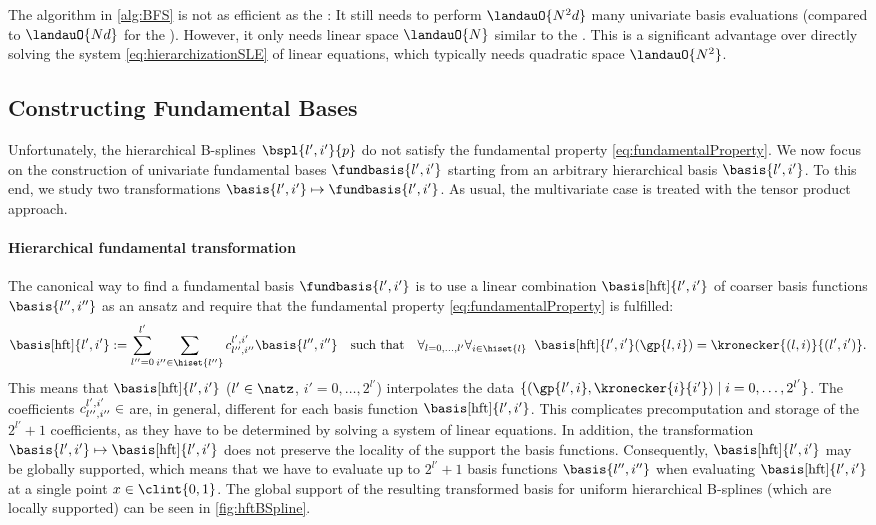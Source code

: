 The \bfs algorithm in \cref{alg:BFS} is not as efficient as the \up:
It still needs to perform $\landauO{N^2 d}$ many univariate
basis evaluations (compared to $\landauO{Nd}$ for the \up).
However, it only needs linear space $\landauO{N}$ similar to the \up.
This is a significant advantage over directly solving the system
\eqref{eq:hierarchizationSLE} of linear equations, which typically
needs quadratic space $\landauO{N^2}$.



\subsection{Constructing Fundamental Bases}
\label{sec:442constructingFundamentalBases}

Unfortunately, the hierarchical B-splines $\bspl{l',i'}{p}$ do not
satisfy the fundamental property \eqref{eq:fundamentalProperty}.
We now focus on the construction of univariate fundamental bases
$\fundbasis{l',i'}$ starting from an
arbitrary hierarchical basis $\basis{l',i'}$.
To this end, we study two transformations
$\basis{l',i'} \mapsto \fundbasis{l',i'}$.
As usual, the multivariate case is treated with the
tensor product approach.

\paragraph{Hierarchical fundamental transformation}

The canonical way to find a fundamental basis $\fundbasis{l',i'}$ is to
use a linear combination $\basis[\hft]{l',i'}$
of coarser basis functions $\basis{l'',i''}$ as an ansatz
and require that the fundamental property \eqref{eq:fundamentalProperty}
is fulfilled:
\begin{equation}
  \label{eq:hierarchicalFundamentalTransformation}
  \basis[\hft]{l',i'}
  := \sum_{l''=0}^{l'} \sum_{i'' \in \hiset{l''}}
  c_{l'',i''}^{l',i'} \basis{l'',i''}
  \quad\text{such that}\quad
  \fafalarge{l = 0, \dotsc, l'}{i \in \hiset{l}}{
    \basis[\hft]{l',i'}(\gp{l,i}) = \kronecker{(l,i)}{(l',i')}.
  }
\end{equation}
This means that
$\basis[\hft]{l',i'}$ ($l' \in \natz$, $i' = 0, \dotsc, 2^{l'}$)
interpolates the data
$\{(\gp{l',i}, \kronecker{i}{i'}) \mid i = 0, \dotsc, 2^{l'}\}$.
The coefficients $c_{l'',i''}^{l',i'} \in \real$
are, in general, different for each basis function $\basis[\hft]{l',i'}$.
This complicates precomputation and storage of the $2^{l'} + 1$ coefficients,
as they have to be determined by solving a system of linear equations.
In addition, the transformation $\basis{l',i'} \mapsto \basis[\hft]{l',i'}$
does not preserve the locality of the support the basis functions.
Consequently, $\basis[\hft]{l',i'}$ may be globally supported,
which means that we have to evaluate up to $2^{l'} + 1$ basis functions
$\basis{l'',i''}$ when evaluating $\basis[\hft]{l',i'}$ at a single point
$x \in \clint{0, 1}$.
The global support of the resulting transformed basis
for uniform hierarchical B-splines (which are locally supported)
can be seen in \cref{fig:hftBSpline}.

